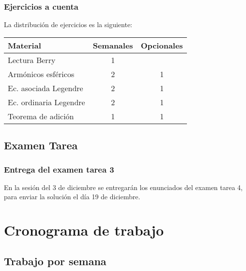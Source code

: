 \documentclass[12pt]{beamer}
\begin{document}
\begin{frame}
\frametitle{Ejercicios a cuenta}
La distribución de ejercicios es la siguiente:
\pause
\renewcommand{\arraystretch}{1.25}
\begin{table}
\centering
\begin{tabular}{l c c}
Material & Semanales & Opcionales \\ \hline
Lectura Berry & 1 &  \\ \hline
Armónicos esféricos  & 2 & 1 \\ \hline
Ec. asociada Legendre & 2 & 1 \\ \hline    
Ec. ordinaria Legendre & 2 & 1 \\ \hline    
Teorema de adición & 1 & 1
\end{tabular}
\end{table}
\end{frame}

\subsection{Examen Tarea}

\begin{frame}
\frametitle{Entrega del examen tarea 3}
En la sesión del 3 de diciembre se entregarán los enunciados del examen tarea 4, \pause para enviar la solución el día 19 de diciembre.
\end{frame}



\section{Cronograma de trabajo}
\subsection{Trabajo por semana}
\end{document}
